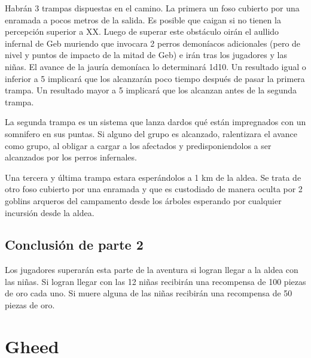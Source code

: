 \documentclass[10pt,twoside,twocolumn,openany]{dndbook}
\begin{document}
Habrán 3 trampas dispuestas en el camino. La primera un foso cubierto por una enramada a pocos metros de la salida. Es posible que caigan si no tienen la percepción superior a XX. Luego de superar este obstáculo oirán el aullido infernal de Geb muriendo que invocara 2 perros demoníacos adicionales (pero de nivel y puntos de impacto de la mitad de Geb) e irán tras los jugadores y las niñas. El avance de la jauría demoníaca lo determinará 1d10. Un resultado igual o inferior a 5 implicará que los alcanzarán poco tiempo después de pasar la primera trampa. Un resultado mayor a 5 implicará que los alcanzan antes de la segunda trampa.

La segunda trampa es un sistema que lanza dardos qué están impregnados con un somnifero en sus puntas. Si alguno del grupo es alcanzado, ralentizara el avance como grupo, al obligar a cargar a los afectados y predisponiendolos a ser alcanzados por los perros infernales.

Una tercera y última trampa estara esperándolos a 1 km de la aldea. Se trata de otro foso cubierto por una enramada y que es custodiado de manera oculta por 2 goblins arqueros del campamento desde los árboles esperando por cualquier incursión desde la aldea.

\section{Conclusión de parte 2}

Los jugadores superarán esta parte de la aventura si logran llegar a la aldea con las niñas. Si logran llegar con las 12 niñas recibirán una recompensa de 100 piezas de oro cada uno. Si muere alguna de las niñas recibirán una recompensa de 50 piezas de oro.

\chapter*{Gheed}
\end{document}

